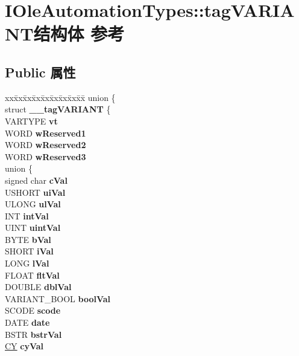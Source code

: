 \hypertarget{struct_i_ole_automation_types_1_1tag_v_a_r_i_a_n_t}{}\section{I\+Ole\+Automation\+Types\+:\+:tag\+V\+A\+R\+I\+A\+N\+T结构体 参考}
\label{struct_i_ole_automation_types_1_1tag_v_a_r_i_a_n_t}
\subsection*{Public 属性}
\begin{DoxyCompactItemize}
\item 
\mbox{\label{struct_i_ole_automation_types_1_1tag_v_a_r_i_a_n_t_ad70b01b578331d12924a221d26407e38}} 
\begin{tabbing}
xx\=xx\=xx\=xx\=xx\=xx\=xx\=xx\=xx\=\kill
union \{\\
\>struct {\bfseries \_\_tagVARIANT} \{\\
\>\>VARTYPE {\bfseries vt}\\
\>\>WORD {\bfseries wReserved1}\\
\>\>WORD {\bfseries wReserved2}\\
\>\>WORD {\bfseries wReserved3}\\
\>\>union \{\\
\>\>\>signed char {\bfseries cVal}\\
\>\>\>USHORT {\bfseries uiVal}\\
\>\>\>ULONG {\bfseries ulVal}\\
\>\>\>INT {\bfseries intVal}\\
\>\>\>UINT {\bfseries uintVal}\\
\>\>\>BYTE {\bfseries bVal}\\
\>\>\>SHORT {\bfseries iVal}\\
\>\>\>LONG {\bfseries lVal}\\
\>\>\>FLOAT {\bfseries fltVal}\\
\>\>\>DOUBLE {\bfseries dblVal}\\
\>\>\>VARIANT\_BOOL {\bfseries boolVal}\\
\>\>\>SCODE {\bfseries scode}\\
\>\>\>DATE {\bfseries date}\\
\>\>\>BSTR {\bfseries bstrVal}\\
\>\>\>\hyperlink{uniontag_c_y}{CY} {\bfseries cyVal}\\

\end{tabbing}
\end{DoxyCompactItemize}
